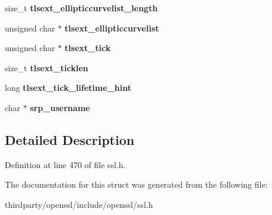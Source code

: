\begin{DoxyCompactItemize}
size\+\_\+t {\bfseries tlsext\+\_\+ellipticcurvelist\+\_\+length}
\item 
\mbox{\label{structssl__session__st_a451da4196b8221f057c1eed1b92375ce}} 
unsigned char $\ast$ {\bfseries tlsext\+\_\+ellipticcurvelist}
\item 
\mbox{\label{structssl__session__st_a061e6eca821a577ac647c1990ad8abb4}} 
unsigned char $\ast$ {\bfseries tlsext\+\_\+tick}
\item 
\mbox{\label{structssl__session__st_a8858f901b65590fa8a077c2ef6f8aef1}} 
size\+\_\+t {\bfseries tlsext\+\_\+ticklen}
\item 
\mbox{\label{structssl__session__st_a8c4421410ed55e716ab61e143f636f24}} 
long {\bfseries tlsext\+\_\+tick\+\_\+lifetime\+\_\+hint}
\item 
\mbox{\label{structssl__session__st_a8b6d3960cbed3af15e739eade86e42c9}} 
char $\ast$ {\bfseries srp\+\_\+username}
\end{DoxyCompactItemize}


\subsection{Detailed Description}


Definition at line 470 of file ssl.\+h.



The documentation for this struct was generated from the following file\+:\begin{DoxyCompactItemize}
\item 
thirdparty/openssl/include/openssl/ssl.\+h\end{DoxyCompactItemize}
